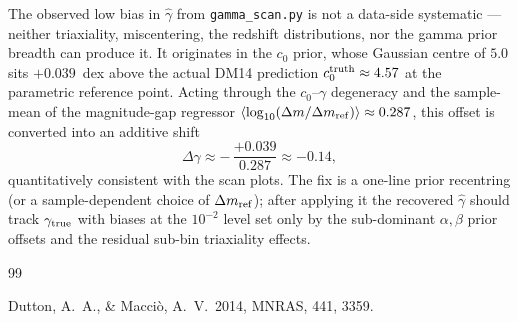 \documentclass[11pt,a4paper]{article}
\providecommand{\mnras}{MNRAS}
\newcommand{\dm}{\Delta m}
\newcommand{\dmref}{\dm_{\rm ref}}
\begin{document}
The observed low bias in $\hat\gamma$ from \texttt{gamma\_scan.py} is not a
data-side systematic — neither triaxiality, miscentering, the redshift
distributions, nor the gamma prior breadth can produce it.  It originates in
the $c_0$ prior, whose Gaussian centre of $5.0$ sits $+0.039$~dex above the
actual DM14 prediction $c_0^{\rm truth} \approx 4.57$ at the parametric
reference point.  Acting through the $c_0$--$\gamma$ degeneracy and the
sample-mean of the magnitude-gap regressor
$\langle\log_{10}(\dm/\dmref)\rangle \approx 0.287$, this offset is converted
into an additive shift
\[
  \Delta\gamma \approx -\,\frac{+0.039}{0.287} \approx -0.14,
\]
quantitatively consistent with the scan plots.  The fix is a one-line prior
recentring (or a sample-dependent choice of $\dmref$); after applying it the
recovered $\hat\gamma$ should track $\gamma_{\rm true}$ with biases at the
$10^{-2}$ level set only by the sub-dominant $\alpha,\beta$ prior offsets and
the residual sub-bin triaxiality effects.

\begin{thebibliography}{99}

Dutton, A.~A., \& Macci\`o, A.~V.\ 2014, \mnras, 441, 3359.

\end{thebibliography}
\end{document}
